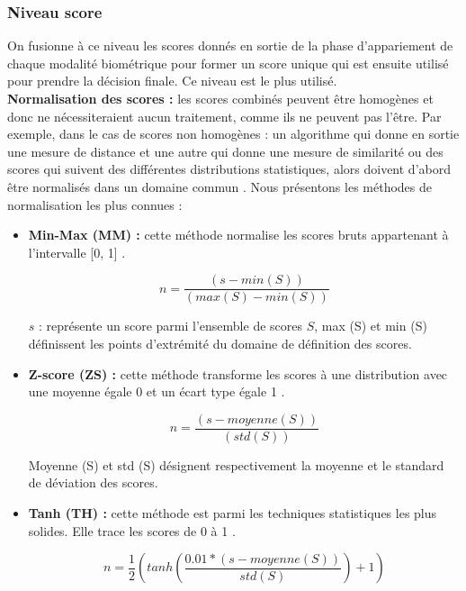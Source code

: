 \subsubsection{Niveau score }
On fusionne à ce niveau les scores donnés en sortie de la phase d’appariement de chaque modalité biométrique pour former un score unique qui est ensuite utilisé pour prendre la décision finale. Ce niveau est le plus utilisé.
\\	\textbf{Normalisation des scores : }
les scores combinés peuvent être homogènes et donc ne nécessiteraient aucun traitement, comme ils ne peuvent pas l’être. Par exemple, dans le cas de scores non homogènes : un algorithme qui donne en sortie une mesure de distance et une autre qui donne une mesure de similarité ou des scores qui suivent des différentes distributions statistiques, alors doivent d’abord être normalisés dans un domaine commun \citep{meyer2009}. Nous présentons les méthodes de normalisation les plus connues : 
\begin{itemize}
	\item \textbf{Min-Max (MM) : }cette méthode normalise les scores bruts appartenant à l’intervalle [0, 1] \citep{ross2006information}.
	\begin{center}
		\begin{equation}\label{eq:minmax}
		n =\dfrac{(s - min (S))}{(max (S)-min (S))}
		\end{equation}
	\end{center}
$ s $ : représente un score parmi l'ensemble de scores $ S $,	max (S) et min (S) définissent les points d'extrémité du domaine de définition des scores.
	\item\textbf{Z-score (ZS) : }cette méthode transforme les scores à une distribution avec une moyenne égale 0 et un écart type égale 1 \citep{ross2006information}.
	
	\begin{center}
		\begin{equation}\label{eq:ZS}
		n =\dfrac{(s - moyenne (S)) }{(std (S))}
		\end{equation}
	\end{center}
	Moyenne (S) et std (S) désignent respectivement la moyenne et le standard de déviation des scores.
	\item \textbf{Tanh (TH) : }
	cette méthode est parmi les techniques statistiques les plus solides. Elle trace les scores de 0 à 1 \citep{ross2006information}.
	\begin{center}
		
		\begin{equation}
		\label{eq:TH}
		n = \frac{1}{2}(tanh(\dfrac{0.01*(s - moyenne (S)) }{std (S)})+1)
		\end{equation}
	\end{center}
\end{itemize}


